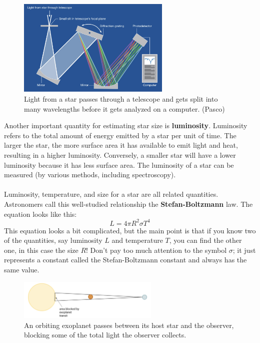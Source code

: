 \documentclass[14pt]{article}
\begin{document}
\begin{figure}[h]
    \centering
    \includegraphics[width=0.65\textwidth]{spectroscopy.png}
    \caption{Light from a star passes through a telescope and gets split into many wavelengths before it gets analyzed on a computer. (Pasco)}
    \label{fig:spectro}
\end{figure}

\noindent Another important quantity for estimating star size is \textbf{luminosity}. Luminosity refers to the total amount of energy emitted by a star per unit of time. The larger the star, the more surface area it has available to emit light and heat, resulting in a higher luminosity. Conversely, a smaller star will have a lower luminosity because it has less surface area. The luminosity of a star can be measured (by various methods, including spectroscopy). 
\\\\
Luminosity, temperature, and size for a star are all related quantities. Astronomers call this well-studied relationship the \textbf{Stefan-Boltzmann} law. The equation looks like this:
\begin{equation}
    L = 4 \pi R^2 \sigma T^4
\end{equation}
This equation looks a bit complicated, but the main point is that if you know two of the quantities, say luminosity $L$ and temperature $T$, you can find the other one, in this case the size $R$! Don't pay too much attention to the symbol $\sigma$; it just represents a constant called the Stefan-Boltzmann constant and always has the same value.

\begin{figure}[htbp]
    \centering
    \includegraphics[width=0.6\textwidth]{exo_area1.png}
    \caption{An orbiting exoplanet passes between its host star and the observer, blocking some of the total light the observer collects.}
    \label{fig:area1}
\end{figure}
\end{document}
